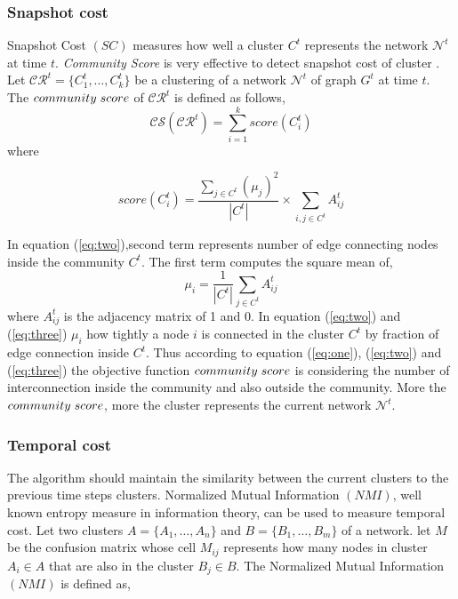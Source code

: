 \documentclass[12pt]{arsubmit}
\begin{document}
\subsubsection{ Snapshot cost} 
Snapshot Cost $(SC)$ measures how well a cluster $C^t$ represents the network $\mathcal{N}^t$ at time $t$.  \emph{Community Score} is very effective to detect snapshot cost of cluster \cite{dynmoga19}. Let $\mathcal{CR}^t = \{C_1^t,\ldots,C_k^t\}$ be a clustering of a network $\mathcal{N}^t$ of graph $G^t$ at time $t$. The $community\hspace{1 mm} score$ of $\mathcal{CR}^t$ is defined as follows, 
\begin{equation} \mathcal{CS}(\mathcal{CR}^t) = \sum\limits_{i=1}^k score(C_i^t) \label {eq:one}
\end{equation} where 

\begin{equation} 
score(C_i^t) = \frac{\sum\nolimits_{j\in C^t} {({\mu}_j )}^2} {|C^t|} \times \sum\limits_{i,j\in C^t} A_{ij}^t  \label{eq:two} 
\end{equation}

In equation (\ref{eq:two}),second term represents number of edge connecting nodes inside the community $C^t$. The first term computes the square mean of, \begin{equation} {\mu}_i = \frac{1} {|C^t|} \sum\limits_{j\in C^t} A_{ij}^t\label{eq:three}\end{equation} where $A_{ij}^t$ is the adjacency matrix of 1 and 0.
In equation (\ref{eq:two}) and (\ref{eq:three}) ${\mu}_i$ how tightly a node $i$ is connected in the cluster $C^t$ by fraction of edge connection inside $C^t$.
Thus according to equation (\ref{eq:one}), (\ref{eq:two}) and (\ref{eq:three}) the objective function $community \hspace{1 mm} score$ is considering the number of interconnection inside the community and also outside the community.
More the $community\hspace{1 mm}score$, more the cluster represents the current network $\mathcal{N}^t$.\\

\subsubsection{Temporal cost}
The algorithm should maintain the similarity between the current clusters to the previous time steps clusters. Normalized Mutual Information $(NMI)$, well known entropy measure in information theory, can be used to measure temporal cost. Let two clusters  $A = \{A_1,\ldots,A_n\}$ and $B = \{B_1,\ldots,B_m\}$ of a network. let $M$ be the confusion matrix whose cell $M_{ij}$ represents how many nodes in cluster $A_i \in A $ that are also in the cluster $B_j \in B$. The Normalized Mutual Information $(NMI)$ is defined as, 
\end{document}
